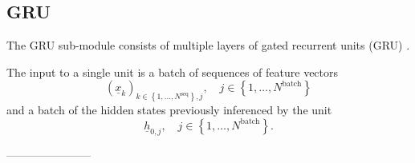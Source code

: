 \subsection*{GRU}
The GRU sub-module consists of multiple layers of 
gated recurrent units (GRU) \cite{Cho2014}.

The input to a single unit is
a batch of sequences of feature vectors
\begin{equation}
    \left(
        \underline x_k
    \right)_{
        k \in \left\{
            1, \dots, N^\text{seq}
        \right\}
        ,
        j
    }
    ,\quad
    j \in \left\{
        1, \dots, N^\text{batch}
    \right\}
\end{equation}
and a batch of the hidden states
previously inferenced by the unit
\begin{equation}
    \underline h_{0,j}
    ,\quad
    j \in \left\{
        1, \dots, N^\text{batch}
    \right\}.
\end{equation}


-----------------------

